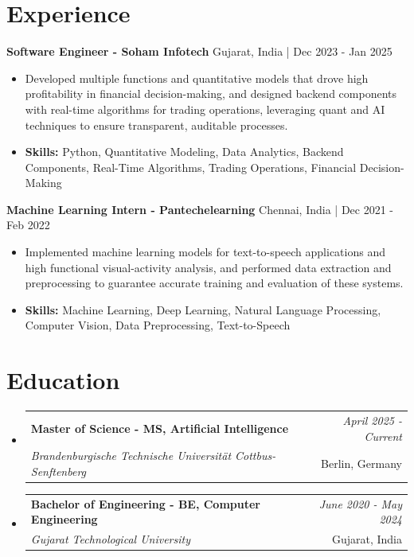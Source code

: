 \documentclass[a4paper,11pt]{article}
\makeatletter
\newcommand{\resumeSubheading}[4]{
\vspace{0.5mm}\item
    \begin{tabular*}{\linewidth}[t]{l@{\extracolsep{\fill}}r}
        \textbf{#1} & \textit{\footnotesize{#4}} \\
        \textit{\footnotesize{#3}} &  \footnotesize{#2}\\
    \end{tabular*}
    \vspace{-2.4mm}
}
\makeatother
\begin{document}
\section{\textbf{Experience}}


\vspace{1mm}
  \textbf{Software Engineer - Soham Infotech} \hfill Gujarat, India | Dec 2023 - Jan 2025
\vspace{-1.5mm} %
\begin{itemize}
  \item Developed multiple functions and quantitative models that drove high profitability in financial decision-making, and designed backend components with real-time algorithms for trading operations, leveraging quant and AI techniques to ensure transparent, auditable processes.

\vspace{-2mm}
  \item \textbf{Skills:} Python, Quantitative Modeling, Data Analytics, Backend Components, Real-Time Algorithms, Trading Operations, Financial Decision-Making
\end{itemize}

\vspace{1mm}
  \textbf{Machine Learning Intern - Pantechelearning} \hfill Chennai, India | Dec 2021 - Feb 2022
\vspace{-1.5mm} %
\begin{itemize}
  \item Implemented machine learning models for text-to-speech applications and high functional visual-activity analysis, and performed data extraction and preprocessing to guarantee accurate training and evaluation of these systems.
\vspace{-2mm}
  \item \textbf{Skills:} Machine Learning, Deep Learning, Natural Language Processing, Computer Vision, Data Preprocessing, Text-to-Speech
\end{itemize}\section{\textbf{Education}}
\vspace{-0.4mm}

\begin{itemize}[leftmargin=0.15in, label={}]
\resumeSubheading
{Master of Science - MS, Artificial Intelligence }{Berlin, Germany}
{Brandenburgische Technische Universität Cottbus-Senftenberg  }{April 2025 - Current}

\vspace{1.0mm} %
\resumeSubheading
{Bachelor of Engineering - BE, Computer Engineering  }{Gujarat, India}
{Gujarat Technological University }{June 2020 - May 2024}

\end{itemize}
\end{document}
